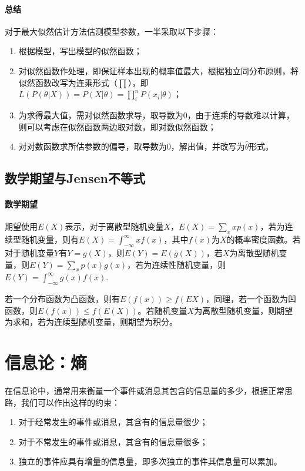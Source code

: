 \documentclass[12pt,a4paper]{article}
\begin{document}
  \paragraph{总结} 对于最大似然估计方法估测模型参数，一半采取以下步骤：
  \begin{enumerate}
    \item 根据模型，写出模型的似然函数；
    \item 对似然函数作处理，即保证样本出现的概率值最大，根据独立同分布原则，将似然函数改写为连乘形式（$\prod$），即$L(P(\theta|X))=P(X|\theta)=\prod\limits_i^n P(x_i|\theta)$；
    \item 为求得最大值，需对似然函数求导，取导数为0，由于连乘的导数难以计算，则可以考虑在似然函数两边取对数，即对数似然函数；
    \item 对对数函数求所估参数的偏导，取导数为0，解出值，并改写为$\hat{\theta}$形式。
  \end{enumerate}
  \subsection{数学期望与Jensen不等式}\label{subsec:e-jensen}
  \paragraph{数学期望} 期望使用$E(X)$表示，对于离散型随机变量$X$，$E(X)=\sum\limits_x xp(x)$，若为连续型随机变量，则有$E(X)=\int_{-\infty}^{\infty} xf(x)$，其中$f(x)$为$X$的概率密度函数。若对于随机变量$Y$有$Y=g(X)$，则$E(Y)=E(g(X))$，若$X$为离散型随机变量，则$E(Y)=\sum\limits_x p(x)g(x)$，若为连续性随机变量，则$E(Y)=\int_{-\infty}^{\infty} g(x)f(x)$.

  若一个分布函数为凸函数，则有$E(f(x)) \geq f(E{X})$，同理，若一个函数为凹函数，则$E(f(x)) \leq f(E(X))$。若随机变量$X$为离散型随机变量，则期望为求和，若为连续型随机变量，则期望为积分。

  \section{信息论：熵}
  在信息论中，通常用来衡量一个事件或消息其包含的信息量的多少，根据正常思路，我们可以作出这样的约束：
  \begin{enumerate}
    \item 对于经常发生的事件或消息，其含有的信息量很少；
    \item 对于不常发生的事件或消息，其含有的信息量很多；
    \item 独立的事件应具有增量的信息量，即多次独立的事件其信息量可以累加。
  \end{enumerate}
\end{document}
